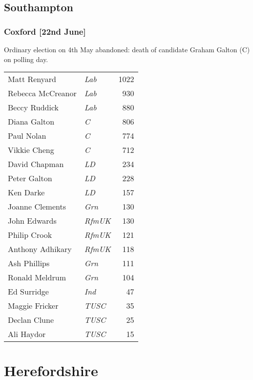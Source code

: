 \documentclass[a4paper,openany]{book}
\begin{document}
\begin{resultsiii}
\subsection*{Southampton}

\subsubsection*{Coxford \hspace*{\fill}\nolinebreak[1]%
	\enspace\hspace*{\fill}
	[22nd June]}


Ordinary election on 4th May abandoned: death of candidate Graham Galton (C) on polling day.

\noindent
\begin{tabular*}{\columnwidth}{@{\extracolsep{\fill}} p{} >{\itshape}l r @{\extracolsep{\fill}}}
	Matt Renyard & Lab & 1022\\
	Rebecca McCreanor & Lab & 930\\
	Beccy Ruddick & Lab & 880\\
	Diana Galton & C & 806\\
	Paul Nolan & C & 774\\
	Vikkie Cheng & C & 712\\
	David Chapman & LD & 234\\
	Peter Galton & LD & 228\\
	Ken Darke & LD & 157\\
	Joanne Clements & Grn & 130\\
	John Edwards & RfmUK & 130\\
	Philip Crook & RfmUK & 121\\
	Anthony Adhikary & RfmUK & 118\\
	Ash Phillips & Grn & 111\\
	Ronald Meldrum & Grn & 104\\
	Ed Surridge & Ind & 47\\
	Maggie Fricker & TUSC & 35\\
	Declan Clune & TUSC & 25\\
	Ali Haydor & TUSC & 15\\
\end{tabular*}

\section{Herefordshire}


\end{resultsiii}
\end{document}
